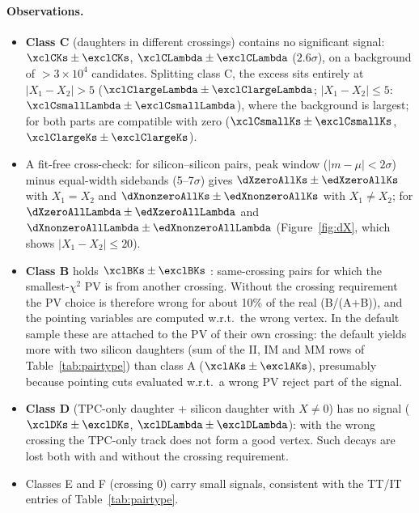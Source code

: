 \paragraph{Observations.}
\begin{itemize}\setlength\itemsep{1pt}
\item \textbf{Class C} (daughters in different crossings) contains no significant signal:
  \Ks{} $\xclCKs\pm\exclCKs$, \Lam{} $\xclCLambda\pm\exclCLambda$ ($2.6\sigma$), on a background
  of $>3\times10^4$ candidates. Splitting class C, the \Lam{} excess sits entirely at
  $|X_1-X_2|>5$ ($\xclClargeLambda\pm\exclClargeLambda$; $|X_1-X_2|\leq5$:
  $\xclCsmallLambda\pm\exclCsmallLambda$), where the background is largest; for \Ks{} both parts
  are compatible with zero ($\xclCsmallKs\pm\exclCsmallKs$, $\xclClargeKs\pm\exclClargeKs$).
\item A fit-free cross-check: for silicon--silicon pairs, peak window ($|m-\mu|<2\sigma$) minus
  equal-width sidebands (5--7$\sigma$) gives \Ks{} $\dXzeroAllKs\pm\edXzeroAllKs$ with
  $X_1=X_2$ and $\dXnonzeroAllKs\pm\edXnonzeroAllKs$ with $X_1\neq X_2$; for \Lam{}
  $\dXzeroAllLambda\pm\edXzeroAllLambda$ and $\dXnonzeroAllLambda\pm\edXnonzeroAllLambda$
  (Figure~\ref{fig:dX}, which shows $|X_1-X_2|\leq20$).
\item \textbf{Class B} holds $\xclBKs\pm\exclBKs$ \Ks: same-crossing pairs for which the
  smallest-$\chi^2$ PV is from another crossing. Without the crossing requirement the PV choice
  is therefore wrong for about 10\% of the real \Ks{} (B/(A+B)), and the pointing variables are computed
  w.r.t.\ the wrong vertex. In the default sample these \Ks{} are attached to the PV of their own
  crossing: the default yields more \Ks{} with two silicon daughters (sum of the II, IM and MM rows of
  Table~\ref{tab:pairtype}) than class A ($\xclAKs\pm\exclAKs$), presumably because pointing cuts evaluated
  w.r.t.\ a wrong PV reject part of the signal.
\item \textbf{Class D} (TPC-only daughter + silicon daughter with $X\neq0$) has no signal
  (\Ks{} $\xclDKs\pm\exclDKs$, \Lam{} $\xclDLambda\pm\exclDLambda$): with the wrong crossing the
  TPC-only track does not form a good vertex. Such decays are lost both with and without the
  crossing requirement.
\item Classes E and F (crossing 0) carry small signals, consistent with the TT/IT entries of
  Table~\ref{tab:pairtype}.
\end{itemize}


